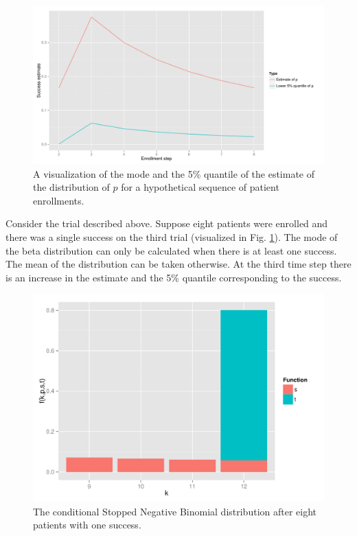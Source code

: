 \documentclass[12pt]{article}         %
\begin{document}
\begin{figure}[ht]
\includegraphics[width=\textwidth]{hypo_traj.pdf}
\caption{
A visualization of the mode and the 5\% quantile of the estimate of the distribution of $p$ for a hypothetical sequence of patient enrollments.
}
\label{fig:hypo}
\end{figure}

Consider the trial described above. Suppose eight patients were enrolled and 
there was a single success on the third trial (visualized in Fig. 
\ref{fig:hypo}). The mode of the beta distribution can only be calculated when 
there is at least one success. The mean of the distribution can be
taken otherwise. At the third time step there is an increase in the estimate and the 5\% quantile corresponding to the success. 

\begin{figure}[ht]
\includegraphics[width=\textwidth]{conditional_snb.pdf}
\caption{
The conditional Stopped Negative Binomial distribution after eight patients with one success.
}
\label{fig:conditional_snb}
\end{figure}
\end{document}
